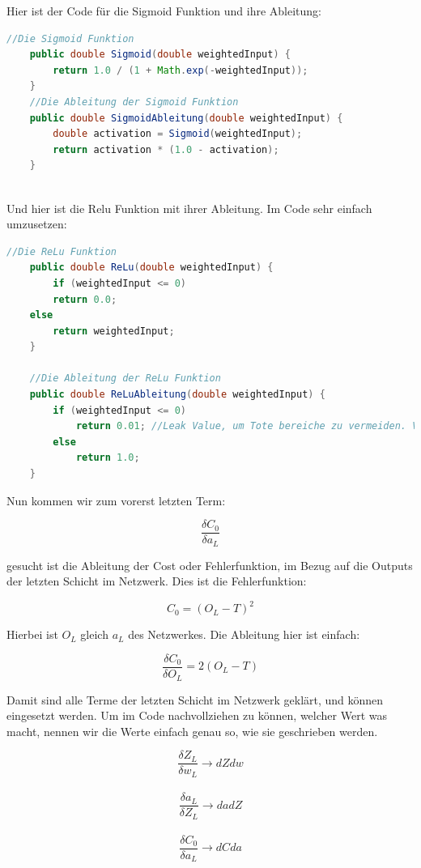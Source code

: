\documentclass[12pt]{article}
\begin{document}
Hier ist der Code für die Sigmoid Funktion und ihre Ableitung:
\begin{lstlisting}[language=Java] 
    //Die Sigmoid Funktion
    public double Sigmoid(double weightedInput) {
        return 1.0 / (1 + Math.exp(-weightedInput));
    }
    //Die Ableitung der Sigmoid Funktion
    public double SigmoidAbleitung(double weightedInput) {
        double activation = Sigmoid(weightedInput);
        return activation * (1.0 - activation);
    }
    
\end{lstlisting} 

Und hier ist die Relu Funktion mit ihrer Ableitung. Im Code sehr einfach umzusetzen:

\begin{lstlisting}[language=Java] 
    //Die ReLu Funktion
    public double ReLu(double weightedInput) {
        if (weightedInput <= 0)
        return 0.0;
    else
        return weightedInput;
    }
        
    //Die Ableitung der ReLu Funktion
    public double ReLuAbleitung(double weightedInput) {
        if (weightedInput <= 0)
            return 0.01; //Leak Value, um Tote bereiche zu vermeiden. Vermutlich bei Sigmoid kein Problem
        else
            return 1.0;
    }
\end{lstlisting} 

Nun kommen wir zum vorerst letzten Term:

$$\frac{\delta C_0}{\delta a_L}$$

gesucht ist die Ableitung der Cost oder Fehlerfunktion, im Bezug auf die Outputs der letzten Schicht im Netzwerk. Dies ist die Fehlerfunktion:

$$C_0 = (O_L - T)^2$$

Hierbei ist $O_L$ gleich $a_L$ des Netzwerkes.
Die Ableitung hier ist einfach:

$$\frac{\delta C_0}{\delta O_L} = 2(O_L - T)$$

Damit sind alle Terme der letzten Schicht im Netzwerk geklärt, und können eingesetzt werden.
Um im Code nachvollziehen zu können, welcher Wert was macht, nennen wir die Werte einfach genau so, wie sie geschrieben werden.


$$\frac{\delta Z_L}{\delta w_L} \rightarrow dZdw $$ \\
$$\frac{\delta a_L}{\delta Z_L} \rightarrow dadZ $$ \\
$$\frac{\delta C_0}{\delta a_L} \rightarrow dCda $$ \\
\end{document}
